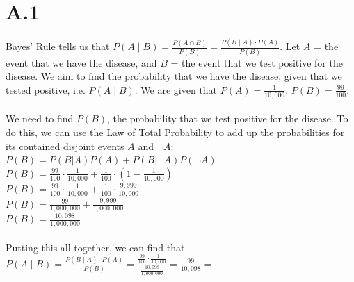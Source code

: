 \documentclass{article}
\date{{}}
\newcommand{\1}{\mathbf{1}}
\begin{document}
\thispagestyle{firstpageheader}

\section*{A.1}
{\Large 

Bayes' Rule tells us that $P(A \mid B) = \frac{P(A \cap B)}{P(B)} = \frac{P(B \mid A) \cdot P(A)}{P(B)}$. Let $A$ = the event that we have the disease, and $B$ = the event that we test positive for the disease. We aim to find the probability that we have the disease, given that we tested positive, i.e. $P(A \mid B)$. We are given that $P(A) = \frac{1}{10,000}$, $P(B) = \frac{99}{100}$. \\ \\ 
We need to find $P(B)$, the probability that we test positive for the disease. To do this, we can use the Law of Total Probability to add up the probabilities for its contained disjoint events $A$ and $\lnot A$: \\
$P(B) = P(B | A)P(A) + P(B | \lnot A)P(\lnot A)$ \\ 
$P(B) = \frac{99}{100} \cdot \frac{1}{10,000} + \frac{1}{100} \cdot (1 - \frac{1}{10,000})$ \\
$P(B) = \frac{99}{100} \cdot \frac{1}{10,000} + \frac{1}{100} \cdot \frac{9,999}{10,000}$ \\
$P(B) = \frac{99}{1,000,000} + \frac{9,999}{1,000,000}$ \\
$P(B) = \frac{10,098}{1,000,000}$ \\ \\
Putting this all together, we can find that \\
$P(A \mid B) = \frac{P(B \mid A) \cdot P(A)}{P(B)} = \frac{\frac{99}{100} \cdot \frac{1}{10,000}}{\frac{10,098}{1,000,000}} = \frac{99}{10,098} = $  \\ 


}
\end{document}
